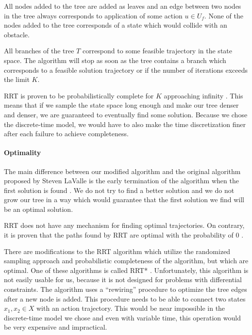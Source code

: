 All nodes added to the tree are added as leaves and an edge between two nodes in the tree always corresponds to application of some action $u\in U_f$. None of the nodes added to the tree corresponds of a state which would collide with an obstacle.

All branches of the tree $T$ correspond to some feasible trajectory in the state space. The algorithm will stop as soon as the tree contains a branch which corresponds to a feasible solution trajectory or if the number of iterations exceeds the limit $K$.

\gls*{RRT} is proven to be probabilistically complete for $K$ approaching infinity \cite{RRT_star}. This means that if we sample the state space long enough and make our tree denser and denser, we are guaranteed to eventually find some solution. Because we chose the discrete-time model, we would have to also make the time discretization finer after each failure to achieve completeness.

\paragraph{Optimality}

The main difference between our modified algorithm and the original algorithm proposed by Steven LaValle is the early termination of the algorithm when the first solution is found \cite{RRT}. We do not try to find a better solution and we do not grow our tree in a way which would guarantee that the first solution we find will be an optimal solution.

\gls*{RRT} does not have any mechanism for finding optimal trajectories. On contrary, it is proven that the paths found by \gls*{RRT} are optimal with the probability of 0 \cite{RRT_star}.

There are modifications to the \gls*{RRT} algorithm which utilize the randomized sampling approach and probabilistic completeness of the algorithm, but which are optimal. One of these algorithms is called \gls{RRT*} \cite{RRT_star}. Unfortunately, this algorithm is not easily usable for us, because it is not designed for problems with differential constraints. The algorithm uses a ``rewiring'' procedure to optimize the tree edges after a new node is added. This procedure needs to be able to connect two states $x_1, x_2\in X$ with an action trajectory. This would be near impossible in the discrete-time model we chose and even with variable time, this operation would be very expensive and impractical.

